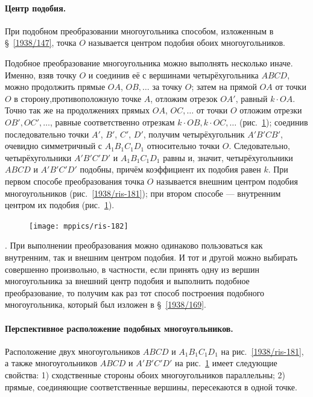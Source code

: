 \documentclass[oneside]{book}
\begin{document}
\paragraph{Центр подобия.}\label{1938/175}
При подобном преобразовании многоугольника способом, изложенным в §~\ref{1938/147}, точка $O$ называется центром подобия обоих многоугольников.

Подобное преобразование многоугольника можно выполнять несколько иначе.
Именно, взяв точку $O$ и соединив её с вершинами четырёхугольника $ABCD$, можно продолжить прямые $OA$, $OB,\dots$
за точку $O$;
затем на прямой $OA$ от точки $O$ в сторону,противоположную точке $A$, отложим отрезок $OA'$, равный $k\cdot OA$.
Точно так же на продолжениях прямых $OA$, $OC,\dots$
от точки $O$ отложим отрезки $OB', OC',\dots$, равные соответственно отрезкам $k\cdot OB, k\cdot OC,\dots$
(рис.~\ref{1938/ris-182});
соединив последовательно точки $A'$, $B'$, $C'$, $D'$, получим четырёхугольник $A'B'CB'$, очевидно симметричный с $A_1B_1C_1D_1$ относительно точки $O$.
Следовательно, четырёхугольники $A'B'C'D'$ и $A_1B_1C_1D_1$ равны и, значит, четырёхугольники $ABCD$ и $A'B'C'D'$ подобны, причём коэффициент их подобия равен $k$.
При первом способе преобразования точка $O$ называется внешним центром подобия многоугольников (рис.~\ref{1938/ris-181});
при втором способе — внутренним центром их подобия (рис.~\ref{1938/ris-182}).

\begin{figure}[h]
\centering
\texttt{[image: mppics/ris-182]}
\caption{}\label{1938/ris-182}
\end{figure}

.
При выполнении преобразования можно одинаково пользоваться как внутренним, так и внешним центром подобия.
И тот и другой можно выбирать совершенно произвольно, в частности, если принять одну из вершин многоугольника за внешний центр подобия и выполнить подобное преобразование, то получим как раз тот способ построения подобного многоугольника, который был изложен в §~\ref{1938/169}.

\paragraph{Перспективное расположение подобных многоугольников.}\label{1938/176}
Расположение двух многоугольников $ABCD$ и $A_1B_1C_1D_1$ на рис.~\ref{1938/ris-181}, а также многоугольников $ABCD$ и $A'B'C'D'$ на рис.~\ref{1938/ris-182} имеет следующие свойства:
1) сходственные стороны обоих многоугольников параллельны;
2) прямые, соединяющие соответственные вершины, пересекаются в одной точке.
\end{document}
